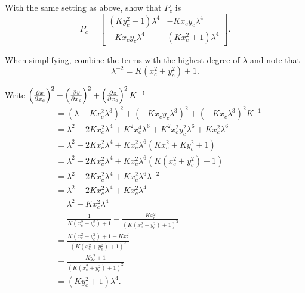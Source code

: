 \documentclass{ximera}
\begin{document}
\begin{problem}
With the same setting as above, show that $P_c$ is
  \[
  P_c =
  \begin{bmatrix}
    \left(Ky_c^2+1\right)\lambda^4 & -Kx_{c}y_{c}\lambda^4\\
    -Kx_{c}y_{c}\lambda^4 & \left(Kx_c^2+1\right)\lambda^4
  \end{bmatrix}.
\]

\begin{hint}
  When simplifying, combine the terms with the highest degree of $\lambda$
  and note that
  \[
  \lambda^{-2} = K\left(x_c^2 + y_c^2\right) + 1.
  \]
\end{hint}
\begin{freeResponse}
  
  Write $\left(\pp[x]{x_c}\right)^2 + \left(\pp[y]{x_c}\right)^2 +\left(\pp[z]{x_c}\right)^2K^{-1}$
    \begin{align*}
      &= \left(\lambda -Kx_c^2 \lambda^3\right)^2 + \left(-Kx_cy_c \lambda^3\right)^2 + \left(-Kx_c \lambda^3\right)^2K^{-1}\\
      &= \lambda^2 - 2Kx_c^2\lambda^4 + K^2x_c^4 \lambda^6+ K^2x_c^2y_c^2\lambda^6 + Kx_c^2\lambda^6\\
      &= \lambda^2 - 2Kx_c^2\lambda^4 + Kx_c^2\lambda^6\left(Kx_c^2 + Ky_c^2 + 1\right)\\
      &= \lambda^2 - 2Kx_c^2\lambda^4 + Kx_c^2\lambda^6\left(K\left(x_c^2 + y_c^2\right) + 1\right)\\
      &= \lambda^2 - 2Kx_c^2\lambda^4 + Kx_c^2\lambda^6 \lambda^{-2}\\
      &= \lambda^2 - 2Kx_c^2\lambda^4 + Kx_c^2\lambda^4\\
      &= \lambda^2 - Kx_c^2\lambda^4\\
      &= \frac{1}{K\left(x_c^2+y_c^2\right)+1} - \frac{Kx_c^2}{\left(K\left(x_c^2+y_c^2\right)+1\right)^2}\\
      &= \frac{K\left(x_c^2 + y_c^2\right) +1 - Kx_c^2}{\left(K\left(x_c^2+y_c^2\right)+1\right)^2}\\
      &= \frac{Ky_c^2+1}{\left(K\left(x_c^2+y_c^2\right)+1\right)^2}\\
      &= \left(Ky_c^2+1\right)\lambda^4.
    \end{align*}
    

\end{freeResponse}
\end{problem}
\end{document}
